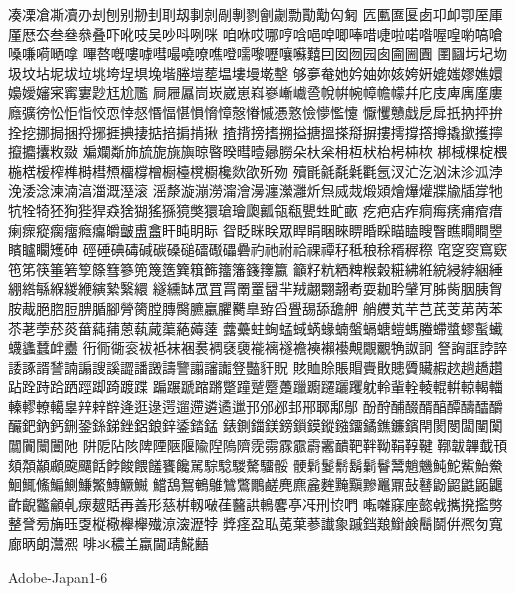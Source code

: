 凑凓凔凘凟刅刦刨别刱刲刵刼剚剠剮剸剹劊劌勡勩勱匃匑
匟匭匲匽卥卭卹卾厔厙厪厯厺叁叄叅叠吓吪吱吴吵呌咧咪
咱咻哎哪哼唅唈唕唧唪唶啑啦喏喒喔喤喲嗃嗆嗓嗛嗬嗮嗱
嗶嗸嘅嘍嘑嘒嘬嘵嘹噍噔嚅嚟嚦嚷囌囏囙囡囫园囱圇圌圚
圛圝圬圮圽圾坟坫坭坺垃垗垮埕埧堍堦塍塏塟塭塿墁墘墼
够夣奙她妗妯妳姟姱姸媲媸嫪嫶嬛嬝嬡嬸宷寗寠尟尪尬尶
屙屜屭峝崁崴崽嵙嵾嶃巇巹帨帲帵幛幨幪幷庀庋庳庽廑廔
廕彍徬忪怇恉恔恧悻惄惽愊愖愪愶慞慤慻慽慿憝憸懜懢懥
懨戄戇戱戹戽扺抐抨拚拴挖挪挶捆捋捓捱捵捿掂掊掮掯揪
揸揹搒搘搠搤搪搵搽搿摒摟摴撐撘撙撬撳擭擰攛攟攮敉敠
斒斕斴斾旈旎旐旟晾暋暌暳曀曏朥朵杕枀枏枑枤枱枵枾栨
梆棫棵椗椳椸楛楥榨榫榯槥槱橊橕橧橱檯櫈櫉欃欻欿歽歾
殰毷毹氄氉氍氬汊汒汔汹沬沴泒浡浼涹淰湅湳湻湽溉溼滚
滛漦漩漰澇澝澮澷瀍瀠灉炘炰烕烖煅熲燴爗爟牃牏牐牚牠
牨牷犄狉狥狴猂猋猞猢猺猻獍獘獧瑲璯瓟瓤瓴瓻甖甡甿畞
疙疤痁痄痌痗痜痡痯瘄瘌瘝瘲瘸癅癊癟皭皽盙盫盰盹眀眎
眢眨眯眹眾睅睊睏睞睤睧睬瞄瞌瞍瞖瞧瞯瞷瞾矉矑矙矱砷
硜硾碘碡碱碳磉磓礌礟礧礨礿祂祔祫祼禫秄秪稂稌稰稺穄
窀窆窔窵窽竾笫筷箠箬箰篨篲篸篼篾簉簨簯籂籒籓籛籜籝
籲籽粇粞粺糇糓糚紼絍綂綅綍綑綞綳綹緐緥緵緶縯縶繄繯
繸纁缽罛罝罥罱罿羀羋羢翽翾翿耇耍耞耹肈肎胏胔胭胰胷
胺胾脃脗脰腗腯腳膋膐膛膞臋臕臝臞臡臯臶舀舋舓舔舚舺
艄艭芄芉芑芪芰苐苪苯苶荖荸菸菼葘蒓蒱蒽蓻蕆蕖蕝薅薘
虂虆蛀蜔蜢蜮蜹蝝蝻螌螎螗螘螞螣螮螿蟉蟚蠘蠛蠭蠺衅衋
衎衕衚衮袚袛袜裍裠裯褎褏褦褵襚襜襫襰襼覥覵覼觕詉詗
詧詾誆誖誶諉諑諝諬諵謆謏謑譅譒譭譸譼譾讅讟豋豓豻貺
賅賉賒賬賵賷贁贃贗贜赮趑趟趫趲跕跧跱跲跴踁踋踦踱蹀
蹁蹍蹏蹜蹡蹩蹱蹵蹷躉躐躕躚躧躩躭軨軰輇輘輥輧輬輵輺
轃轇轑轕辠辡辢辥逄逛逯遌遛遰遴遹邋邘邠邲邽郉郰鄅鄥
酚酧酺醊醑醕醰醻醽釂釅鈀鈉鈣鉶銎銯銻銼鋁鋃鋅鋈錔錳
錶鍘鍿鎂鎊鎻鏌鏦鏹鐂鐍鐎鐮鑌閈閡閿闆闉闑闒闠闤闦阤
阱阸阽陔陴陻陿隁隃隉隖隮霃霛霡霢霨霱靧靶靽靿鞙鞟鞬
鞹韍韠韯頇頦頮顢顣颴飅餂餑餕餵饈饔饞駡騌騐騣驁驑骽
骾鬁鬉鬋鬍鬎鬙鬵魈魕魨鮀鮆鮐鮝鮰鮿鯈鯿鰂鰜鰵鱄鱖鱡
鱨鴰鴽鵪鵻鷥鷩鷳鹺麂麃麄麰黤黰黲鼉鼏鼔鼛鼢鼦鼪鼫鼴
齚齯龞龥𠃵𤸄𤿲𧵳再善形慈栟軔㗞龿鿀鿁鿂𪊲𠅘𠖱𠛬𫝓𠵘
𫝚𫝜𥧌𫝶㦤㦸𢹂𫝼㩜𠟈𢿫𧦴㫄㫋𫞂㪅𫞋㯳櫸𣟱𫞔鿌㴱𤁋㹀
㢡𫞬𫞯𫟉𫟏𫟒𦲞䜟𧰼䠞𫟰𫝥𫠍𫠗鬝鬬倂凞匇寬廊昞朗灊凞
啡氺穠𦍌蠃閫靕𩸽𪘚

Adobe-Japan1-6

